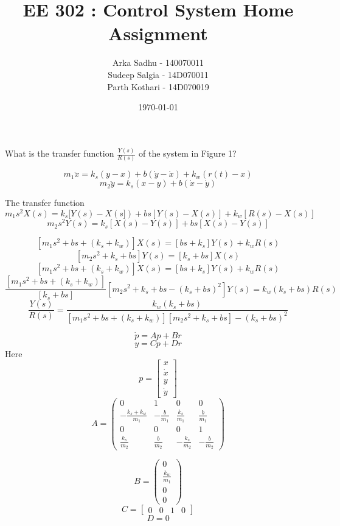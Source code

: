 \documentclass{article}
\title{EE 302 : Control System Home Assignment}
\author{
  Arka Sadhu - 140070011\\
  Sudeep Salgia - 14D070011\\
  Parth Kothari - 14D070019\\
}
\date{\today}
\newenvironment{question}[2][Question]{\begin{trivlist}
  \item[\hskip \labelsep {\bfseries #1}\hskip \labelsep {\bfseries #2:}]}{\end{trivlist}}
\newenvironment{answer}[2][Answer]{\begin{trivlist}
  \item[\hskip \labelsep {\bfseries #1}\hskip \labelsep {\bfseries #2:}]}{\end{trivlist}}
\begin{document}
\maketitle
\begin{question}{1} What is the transfer function $\frac{Y(s)}{R(s)}$ of the system in Figure 1?
\end{question}
\begin{answer} a
  \begin{equation}
    \label{eq:1}
    m_1\ddot{x} = k_s(y-x) + b(\dot{y} - \dot{x}) + k_w(r(t) - x)
  \end{equation}
  \begin{equation}
    \label{eq:2}
    m_2\ddot{y} = k_s(x-y) + b(\dot{x} - \dot{y}) 
  \end{equation}
\end{answer}

The transfer function
$$m_1s^2X(s) = k_s[Y(s) - X(s]) + bs[Y(s) - X(s)] + k_w[R(s) - X(s)]$$
$$m_2s^2 Y(s) = k_s[X(s) - Y(s)] + bs[X(s) - Y(s)]$$

$$[m_1s^2 + bs + (k_s+k_w)]X(s) = [bs + k_s]Y(s) + k_wR(s)$$
$$[m_2s^2 + k_s + bs]Y(s) = [k_s + bs]X(s)$$
$$[m_1s^2 + bs + (k_s + k_w)]X(s) = [bs + k_s]Y(s) + k_wR(s)$$
$$\frac{[m_1s^2 + bs + (k_s + k_w)]}{[k_s + bs]}[m_2s^2 + k_s + bs - (k_s + bs)^2]Y(s) = k_w(k_s+ bs)R(s)$$
$$\frac{Y(s)}{R(s)} = \frac{ k_w(k_s+ bs)}{[m_1s^2 + bs + (k_s + k_w)][m_2s^2 + k_s + bs] - (k_s + bs)^2}$$
\begin{answer}b
  $$\dot{p} = Ap + Br$$
  $$y = Cp + Dr$$
  Here
  \[
    p = \begin{bmatrix}
      x \\
      \dot{x}\\
      y\\
      \dot{y}
    \end{bmatrix}
  \]
  $$A = \left(\begin{array}{cccc} 0 & 1 & 0 & 0\\ -\frac{k_{s} + k_{w}}{m_{1}} & -\frac{b}{m_{1}} & \frac{k_{s}}{m_{1}} & \frac{b}{m_{1}}\\ 0 & 0 & 0 & 1\\ \frac{k_{s}}{m_{2}} & \frac{b}{m_{2}} & -\frac{k_{s}}{m_{2}} & -\frac{b}{m_{2}} \end{array}\right)$$

  $$B = \left(\begin{array}{c} 0\\ \frac{k_{w}}{m_{1}}\\ 0\\ 0 \end{array}\right)$$
  \[
    C =
    \begin{bmatrix}
      0 & 0 & 1 & 0
    \end{bmatrix}
  \]
  $$ D = 0$$
\end{answer}
\end{document}
